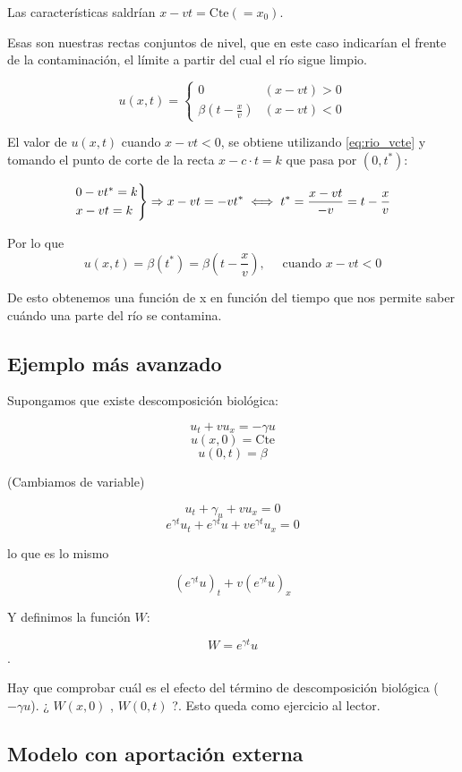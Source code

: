 		Las características saldrían \(x-vt = \text{Cte}(=x_0) \label{eq:rio_vcte}\).

		Esas son nuestras rectas conjuntos de nivel, que en este caso indicarían el frente de la contaminación, el límite a partir del cual el río sigue limpio.

		$$u(x,t) =
			\begin{cases}
				0                      & (x-vt) > 0 \\
				\beta(t - \frac{x}{v}) & (x-vt) < 0
			\end{cases}
		$$

		El valor de $u(x,t)$ cuando $x-vt < 0$, se obtiene utilizando \ref{eq:rio_vcte} y tomando el punto de corte de la recta $x-c \cdot t=k$ que pasa por $(0,t^*)$:

		$$
		\begin{rcases}
			0 - vt^{*} = k \\
			x - vt = k
		\end{rcases}
		 \Rightarrow x-vt = -vt^{*} \iff t^* = \frac{x-vt}{-v} = t - \frac{x}{v}$$

		Por lo que
		$$u(x,t) = \beta(t^*) = \beta(t - \frac{x}{v}), \quad \text{ cuando } x - vt < 0$$

		De esto obtenemos una función de x en función del tiempo que nos permite saber cuándo una parte del río se contamina.

	\subsection{Ejemplo más avanzado}

		Supongamos que existe descomposición biológica:

		$$u_t + vu_x = -\gamma u$$
		$$u(x,0) = \text{Cte}$$
		$$u(0,t) = \beta$$

		(Cambiamos de variable)

		$$u_t + \gamma_u + vu_x = 0$$
		$$e^{\gamma t} u_t + e^{\gamma t} u + v e^{ \gamma t} u_x = 0 $$

		lo que es lo mismo

		$$(e^{\gamma t}u)_t + v (e^{\gamma t} u)_x$$

		Y definimos la función $W$:

		$$W = e^{\gamma t}u$$.


		Hay que comprobar cuál es el efecto del término de descomposición biológica ($-\gamma u$). ¿ $W(x,0)$ , $ W(0,t)$ ?. Esto queda como ejercicio al lector.


	\subsection{Modelo con aportación externa}

